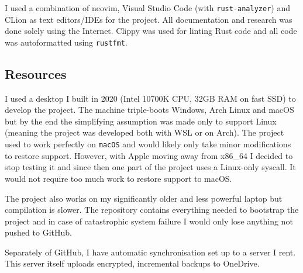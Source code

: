 I used a combination of neovim, Visual Studio Code (with \texttt{rust-analyzer}) and CLion as text
editors/IDEs for the project. All documentation and research was done solely using the Internet.
Clippy was used for linting Rust code and all code was autoformatted using \texttt{rustfmt}.

\subsection{Resources}

I used a desktop I built in 2020 (Intel 10700K CPU, 32GB RAM on fast SSD) to develop the project.
The machine triple-boots Windows, Arch Linux and macOS but by the end the simplifying assumption
was made only to support Linux (meaning the project was developed both with WSL or on Arch). The
project used to work perfectly on \texttt{macOS} and would likely only take minor modifications to
restore support. However, with Apple moving away from x86\_64 I decided to stop testing it and
since
then one part of the project uses a Linux-only syscall. It would not require too much work to
restore support to macOS.

The project also works on my significantly older and less powerful laptop but compilation is
slower.
The repository contains everything needed to bootstrap the project and in case of catastrophic
system failure I would only lose anything not pushed to GitHub.

Separately of GitHub, I have automatic synchronisation set up to a server I rent. This server
itself
uploads encrypted, incremental backups to OneDrive.
